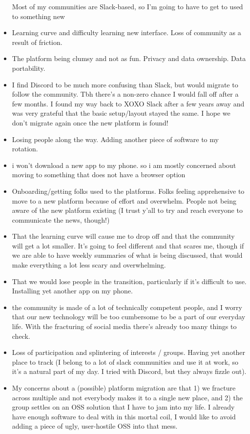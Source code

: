 \documentclass[
]{book}
\begin{document}
\begin{itemize}
  Most of my communities are Slack-based, so I'm going to have to get to used to something new
\item
  Learning curve and difficulty learning new interface. Loss of community as a result of friction.
\item
  The platform being clumsy and not as fun. Privacy and data ownership. Data portability.
\item
  I find Discord to be much more confusing than Slack, but would migrate to follow the community. Tbh there's a non-zero chance I would fall off after a few months. I found my way back to XOXO Slack after a few years away and was very grateful that the basic setup/layout stayed the same. I hope we don't migrate again once the new platform is found!
\item
  Losing people along the way. Adding another piece of software to my rotation.
\item
  i won't download a new app to my phone. so i am mostly concerned about moving to something that does not have a browser option
\item
  Onboarding/getting folks used to the platforms. Folks feeling apprehensive to move to a new platform because of effort and overwhelm. People not being aware of the new platform existing (I trust y'all to try and reach everyone to communicate the news, though!)
\item
  That the learning curve will cause me to drop off and that the community will get a lot smaller. It's going to feel different and that scares me, though if we are able to have weekly summaries of what is being discussed, that would make everything a lot less scary and overwhelming.
\item
  That we would lose people in the transition, particularly if it's difficult to use. Installing yet another app on my phone.
\item
  the community is made of a lot of technically competent people, and I worry that our new technology will be too cumbersome to be a part of our everyday life. With the fracturing of social media there's already too many things to check.
\item
  Loss of participation and splintering of interests / groups. Having yet another place to track (I belong to a lot of slack communities and use it at work, so it's a natural part of my day. I tried with Discord, but they always fizzle out).
\item
  My concerns about a (possible) platform migration are that 1) we fracture across multiple and not everybody makes it to a single new place, and 2) the group settles on an OSS solution that I have to jam into my life. I already have enough software to deal with in this mortal coil, I would like to avoid adding a piece of ugly, user-hostile OSS into that mess.

\end{itemize}
\end{document}
